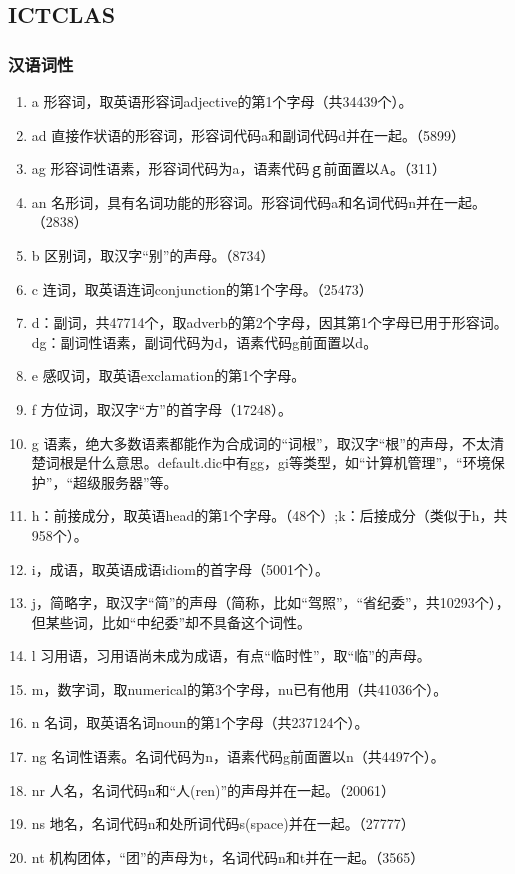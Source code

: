 \subsection{ICTCLAS}
\subsubsection{汉语词性}
\begin{enumerate}[(1)]
\item a 形容词，取英语形容词adjective的第1个字母（共34439个）。
\item ad 直接作状语的形容词，形容词代码a和副词代码d并在一起。（5899）
\item ag 形容词性语素，形容词代码为a，语素代码ｇ前面置以A。（311）
\item an 名形词，具有名词功能的形容词。形容词代码a和名词代码n并在一起。（2838）
\item b 区别词，取汉字“别”的声母。（8734）
\item c 连词，取英语连词conjunction的第1个字母。（25473）
\item d：副词，共47714个，取adverb的第2个字母，因其第1个字母已用于形容词。dg：副词性语素，副词代码为d，语素代码g前面置以d。
\item e 感叹词，取英语exclamation的第1个字母。
\item f 方位词，取汉字“方”的首字母（17248）。
\item g 语素，绝大多数语素都能作为合成词的“词根”，取汉字“根”的声母，不太清楚词根是什么意思。default.dic中有gg，gi等类型，如“计算机管理”，“环境保护”，“超级服务器”等。
\item h：前接成分，取英语head的第1个字母。（48个）;k：后接成分（类似于h，共958个）。
\item i，成语，取英语成语idiom的首字母（5001个）。
\item j，简略字，取汉字“简”的声母（简称，比如“驾照”，“省纪委”，共10293个），但某些词，比如“中纪委”却不具备这个词性。
\item l 习用语，习用语尚未成为成语，有点“临时性”，取“临”的声母。
\item m，数字词，取numerical的第3个字母，nu已有他用（共41036个）。
\item n 名词，取英语名词noun的第1个字母（共237124个）。
\item ng 名词性语素。名词代码为n，语素代码g前面置以n（共4497个）。
\item nr 人名，名词代码n和“人(ren)”的声母并在一起。（20061）
\item ns 地名，名词代码n和处所词代码s(space)并在一起。（27777）
\item nt 机构团体，“团”的声母为t，名词代码n和t并在一起。（3565）

\end{enumerate}
